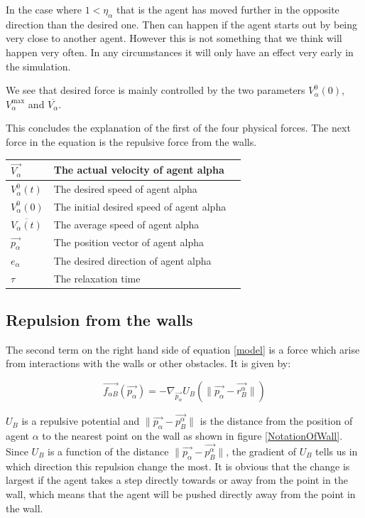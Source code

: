 In the case where $1 < \eta_{\alpha}$ that is the agent has moved further 
in the opposite direction than the desired one. Then can happen if the agent 
starts out by being very close to another agent. However this is not something 
that we think will happen very often. In any circumstances it will only have an 
effect very early in the simulation. 

We see that desired force is mainly controlled by the two parameters $V_{\alpha}^{0} (0)$, 
$V_{\alpha}^{\text{max}}$ and $\overline{V_{\alpha}}$.

This concludes the explanation of the first of the four physical forces. The next 
force in the equation is the repulsive force from the walls.

\begin{center}
\begin{tabular}{lll}
\hline
$\vec{V_{\alpha}}$ & The actual velocity of agent alpha &\\
\hline
$V_{\alpha}^{0}(t)$ & The desired speed of agent alpha &\\
\hline
$V_{\alpha}^{0}(0)$ & The initial desired speed of agent alpha &\\
\hline
$\overline{V_{\alpha}(t)}$ & The average speed of agent alpha &\\
\hline
$\vec{p_{\alpha}}$ & The position vector of agent alpha\\
\hline
$e_{\alpha}$& The desired direction of agent alpha\\
\hline
$\tau$& The relaxation time &\\
\hline
\end{tabular}
\end{center}

\subsection{Repulsion from the walls}
The second term on the right hand side of equation \eqref{model} is a force which 
arise from interactions with the walls or other obstacles. It is given by:

\begin{equation}\label{wallpotential}
    \vec{f_{\alpha B}} \left( \vec{p_{\alpha}} \right) =
    - \nabla_{\vec{p_{\alpha}}} U_{B}
    \left( \| \vec{p_{\alpha}} - \vec{r_{B}^{\alpha}} \| \right)
\end{equation}

$U_B$ is a repulsive potential and $\|\vec{p_{\alpha}} - \vec{p_{B}^{\alpha}}\|$ 
is the distance from the position of agent $\alpha$ to the nearest point on the 
wall as shown in figure \ref{NotationOfWall}. Since $U_B$ is a function of the distance 
$\| \vec{p_{\alpha}} - \vec{p_{B}^{\alpha}} \|$, the gradient of $U_B$ tells us in 
which direction this repulsion change the most. It is obvious that the change is 
largest if the agent takes a step directly towards or away from the point in the wall, 
which means that the agent will be pushed directly away from the point in the wall.

